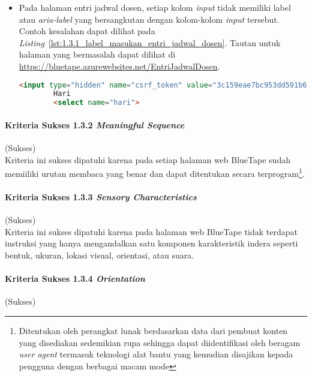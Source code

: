 \begin{itemize}
    \item Pada halaman entri jadwal dosen, setiap kolom \textit{input} tidak memiliki label atau \textit{aria-label} yang bersangkutan dengan kolom-kolom \textit{input} tersebut. Contoh kesalahan dapat dilihat pada \mbox{\textit{Listing} \ref{lst:1.3.1_label_masukan_entri_jadwal_dosen}}. Tautan untuk halaman yang bermasalah dapat dilihat di \url{https://bluetape.azurewebsites.net/EntriJadwalDosen}.
    \begin{lstlisting}[frame=single, label={lst:1.3.1_label_masukan_entri_jadwal_dosen}, language=HTML, caption=Pelanggaran Kriteria Sukses 1.3.1 pada Halaman Entri Jadwal Dosen]
        <input type="hidden" name="csrf_token" value="3c159eae7bc953dd591b679c080ed066"/>
        Hari
        <select name="hari">
    \end{lstlisting}
\end{itemize} 

\paragraph{Kriteria Sukses 1.3.2 \textit{Meaningful Sequence}}
\label{par:kepatuhan_bluetape_kriteria_sukses_1.3.2}
(Sukses)\\

Kriteria ini sukses dipatuhi karena pada setiap halaman web BlueTape sudah memiiliki urutan membaca yang benar dan dapat ditentukan secara terprogram\footnote{Ditentukan oleh perangkat lunak berdasarkan data dari pembuat konten yang disediakan sedemikian rupa sehingga dapat diidentifikasi oleh beragam \textit{user agent} termasuk teknologi alat bantu yang kemudian disajikan kepada pengguna dengan berbagai macam mode}. 

\paragraph{Kriteria Sukses 1.3.3 \textit{Sensory Characteristics}}
\label{par:kepatuhan_bluetape_kriteria_sukses_1.3.3}
(Sukses)\\

Kriteria ini sukses dipatuhi karena pada halaman web BlueTape tidak terdapat instruksi yang hanya mengandalkan satu komponen karakteristik indera seperti bentuk, ukuran, lokasi visual, orientasi, atau suara.

\paragraph{Kriteria Sukses 1.3.4 \textit{Orientation}}
\label{par:kepatuhan_bluetape_kriteria_sukses_1.3.4}
(Sukses)\\

